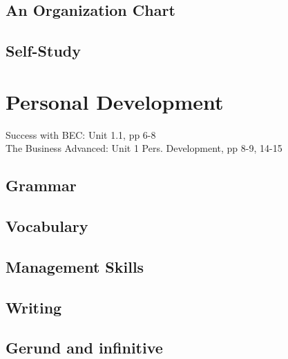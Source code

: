 \section{An Organization Chart}
\section{Self-Study}


\chapter{Personal Development}
Success with BEC: Unit 1.1, pp 6-8\\
The Business Advanced: Unit 1 Pers. Development, pp 8-9, 14-15
\section{Grammar}

\section{Vocabulary}
\section{Management Skills}

\section{Writing}

\section{Gerund and infinitive}
